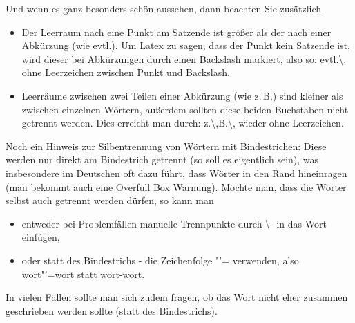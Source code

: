 Und wenn es ganz besonders schön aussehen, dann beachten Sie zusätzlich
\begin{itemize}
\item Der Leerraum nach eine Punkt am Satzende ist größer als der nach einer Abkürzung (wie evtl.). 
Um Latex zu sagen, dass der Punkt kein Satzende ist, wird dieser bei Abkürzungen durch einen Backslash markiert, also so: evtl.\textbackslash, ohne Leerzeichen zwischen Punkt und Backslash.

\item
Leerräume zwischen zwei Teilen einer Abkürzung (wie z.\,B.) sind kleiner als zwischen einzelnen Wörtern, außerdem sollten diese beiden Buchstaben nicht getrennt werden. Dies erreicht man durch: z.\textbackslash,B.\textbackslash, wieder ohne Leerzeichen.
\end{itemize}
Noch ein Hinweis zur Silbentrennung von Wörtern mit Bindestrichen: Diese werden nur direkt am Bindestrich getrennt (so soll es eigentlich sein), was insbesondere im Deutschen oft dazu führt, dass Wörter in den Rand hineinragen (man bekommt auch eine Overfull Box Warnung).
Möchte man, dass die Wörter selbst auch getrennt werden dürfen, so kann man
\begin{itemize}
\item
entweder bei Problemfällen manuelle Trennpunkte durch \textbackslash - in das Wort einfügen,
\item oder statt des Bindestrichs - die Zeichenfolge "'= verwenden, also wort"'=wort statt wort-wort.
\end{itemize}
In vielen Fällen sollte man sich zudem fragen, ob das Wort nicht eher zusammen geschrieben werden sollte (statt des Bindestrichs).


